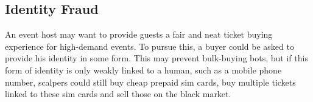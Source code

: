 \subsection{Identity Fraud}\label{subsection:identity-fraud}

An event host may want to provide guests a fair and neat ticket buying experience for high-demand events. To pursue this, a buyer could be asked to provide his identity in some form. This may prevent bulk-buying bots, but if this form of identity is only weakly linked to a human, such as a mobile phone number, scalpers could still buy cheap prepaid sim cards, buy multiple tickets linked to these sim cards and sell those on the black market.
